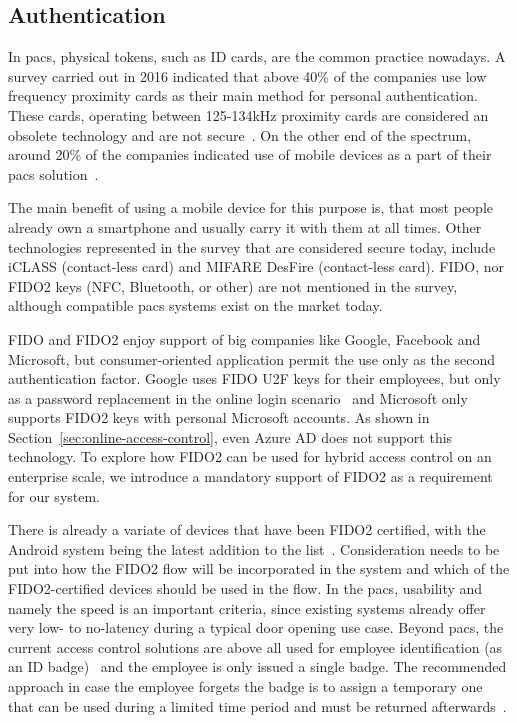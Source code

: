 \subsection{Authentication}
In \acrshort{pacs}, physical tokens, such as ID cards, are the common practice nowadays. A survey carried out in 2016 indicated that above 40\% of the companies use low frequency proximity cards as their main method for personal authentication. These cards, operating between 125-134kHz proximity cards are considered an obsolete technology and are not secure~\cite{Hakamaki2015SecurityTechnology}. On the other end of the spectrum, around 20\% of the companies indicated use of mobile devices as a part of their \acrshort{pacs} solution~\cite{HIDGlobal2017TheEnterprise}. 

The main benefit of using a mobile device for this purpose is, that most people already own a smartphone and usually carry it with them at all times. Other technologies represented in the survey that are considered secure today, include iCLASS (contact-less card) and MIFARE DesFire (contact-less card). FIDO, nor FIDO2 keys (NFC, Bluetooth, or other) are not mentioned in the survey, although compatible \acrshort{pacs} systems exist on the market today\footnotemark. 

FIDO and FIDO2 enjoy support of big companies like Google, Facebook and Microsoft, but consumer-oriented application permit the use only as the second authentication factor. Google uses FIDO U2F keys for their employees, but only as a password replacement in the online login scenario~\cite{Krebs2018Google:Phishing} and Microsoft only supports FIDO2 keys with personal Microsoft accounts. As shown in Section~\ref{sec:online-access-control}, even Azure AD does not support this technology. To explore how FIDO2 can be used for hybrid access control on an enterprise scale, we introduce a mandatory support of FIDO2 as a requirement for our system.
% 

There is already a variate of devices that have been FIDO2 certified, with the Android system being the latest addition to the list~\cite{FIDOAlliance2019AndroidPasswords}. Consideration needs to be put into how the FIDO2 flow will be incorporated in the system and which of the FIDO2-certified devices should be used in the flow. In the \acrshort{pacs}, usability and namely the speed is an important criteria, since existing systems already offer very low- to no-latency during a typical door opening use case. Beyond \acrshort{pacs}, the current access control solutions are above all used for employee identification (as an ID badge)~\cite{HIDGlobal2017TheEnterprise} and the employee is only issued a single badge. The recommended approach in case the employee forgets the badge is to assign a temporary one that can be used during a limited time period and must be returned afterwards~\cite{Ryan2018HowBadges}.

